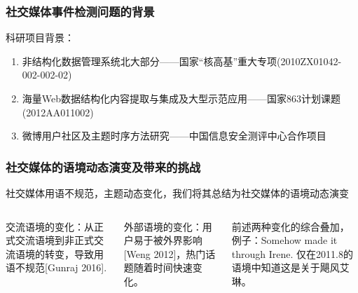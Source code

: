 \begin{frame}
\frametitle{\noindent 社交媒体事件检测问题的背景}	
科研项目背景：
\begin{enumerate}
	\item 非结构化数据管理系统北大部分——国家“核高基”重大专项(2010ZX01042-002-002-02)
	\item 海量Web数据结构化内容提取与集成及大型示范应用——国家863计划课题(2012AA011002)
	\item 微博用户社区及主题时序方法研究——中国信息安全测评中心合作项目
\end{enumerate}
\end{frame}


\begin{frame}
\frametitle{\noindent 社交媒体的语境动态演变及带来的挑战}
\begin{tcolorbox}[colback=red!5,colframe=red!75!black]
社交媒体用语不规范，主题动态变化，我们将其总结为社交媒体的语境动态演变
\end{tcolorbox}

\vspace{-5mm}

\begin{columns}[onlytextwidth, t]
    \begin{tcolorbox}[colback=red!5,colframe=red!5]
    交流语境的变化：从正式交流语境到非正式交流语境的转变，导致用语不规范[Gunraj 2016].
    \end{tcolorbox}

    \begin{tcolorbox}[colback=red!5,colframe=red!5]
    外部语境的变化：用户易于被外界影响[Weng 2012]，热门话题随着时间快速变化。
    \end{tcolorbox}
    
    \begin{tcolorbox}[colback=red!5,colframe=red!5]
    前述两种变化的综合叠加，例子：Somehow made it through Irene. 仅在2011.8的语境中知道这是关于飓风艾琳。 
    \end{tcolorbox}
\end{columns}

\end{frame}

